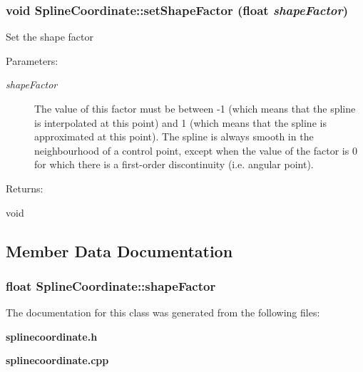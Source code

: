 \subsubsection{\setlength{\rightskip}{0pt plus 5cm}void Spline\-Coordinate::set\-Shape\-Factor (float {\em shape\-Factor})\hspace{0.3cm}{\tt  [inline]}}\label{classSplineCoordinate_a4}


Set the shape factor \begin{Desc}
\item[Parameters: ]\par
\begin{description}
\item[{\em 
shape\-Factor}]The value of this factor must be between -1 (which means that the spline is interpolated at this point) and 1 (which means that the spline is approximated at this point). The spline is always smooth in the neighbourhood of a control point, except when the value of the factor is 0 for which there is a first-order discontinuity (i.e. angular point). \end{description}
\end{Desc}
\begin{Desc}
\item[Returns: ]\par
void \end{Desc}


\subsection{Member Data Documentation}
\subsubsection{\setlength{\rightskip}{0pt plus 5cm}float Spline\-Coordinate::shape\-Factor\hspace{0.3cm}{\tt  [private]}}\label{classSplineCoordinate_o0}




The documentation for this class was generated from the following files:\begin{CompactItemize}
\item 
{\bf splinecoordinate.h}\item 
{\bf splinecoordinate.cpp}\end{CompactItemize}
